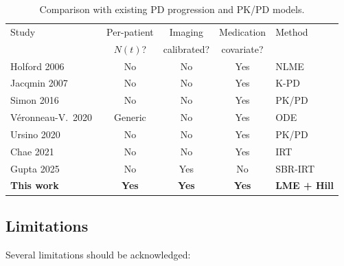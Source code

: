 \begin{table}[t]
\centering
\caption{Comparison with existing PD progression and PK/PD models.}
\label{tab:comparison}
\footnotesize
\begin{tabular}{@{}lcccl@{}}
\toprule
Study & Per-patient & Imaging & Medication & Method \\
      & $N(t)$?     & calibrated? & covariate? & \\
\midrule
Holford 2006~\cite{holford2006} & No & No & Yes & NLME \\
Jacqmin 2007~\cite{jacqmin2007} & No & No & Yes & K-PD \\
Simon 2016~\cite{simon2016} & No & No & Yes & PK/PD \\
V\'{e}ronneau-V.\ 2020~\cite{veronneau2020} & Generic & No & Yes & ODE \\
Ursino 2020~\cite{ursino2020} & No & No & Yes & PK/PD \\
Chae 2021~\cite{chae2021} & No & No & Yes & IRT \\
Gupta 2025~\cite{gupta2025} & No & Yes & No & SBR-IRT \\
\textbf{This work} & \textbf{Yes} & \textbf{Yes} & \textbf{Yes} & \textbf{LME + Hill} \\
\bottomrule
\end{tabular}
\end{table}


\subsection{Limitations}

Several limitations should be acknowledged:

